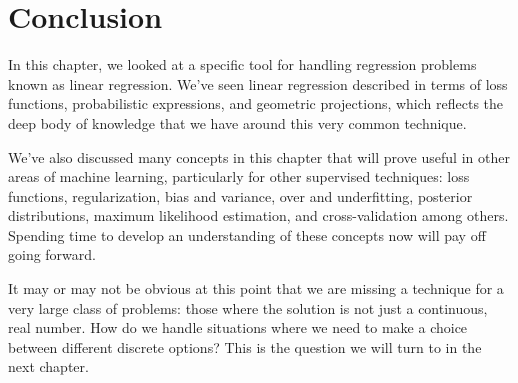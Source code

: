 \section{Conclusion}
In this chapter, we looked at a specific tool for handling regression problems known as linear regression. We've seen linear regression described in terms of loss functions, probabilistic expressions, and geometric projections, which reflects the deep body of knowledge that we have around this very common technique.

We've also discussed many concepts in this chapter that will prove useful in other areas of machine learning, particularly for other supervised techniques: loss functions, regularization, bias and variance, over and underfitting, posterior distributions, maximum likelihood estimation, and cross-validation among others. Spending time to develop an understanding of these concepts now will pay off going forward.

It may or may not be obvious at this point that we are missing a technique for a very large class of problems: those where the solution is not just a continuous, real number. How do we handle situations where we need to make a choice between different discrete options? This is the question we will turn to in the next chapter.

